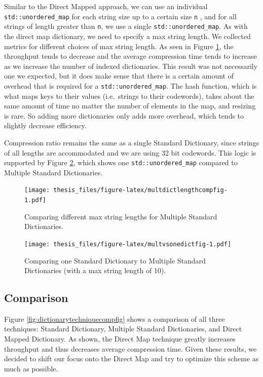 \documentclass[12pt,twoside]{reedthesis}
\begin{document}
Similar to the Direct Mapped approach, we can use an individual \texttt{std::unordered\_map} for each string size up to a certain size \texttt{n} , and for all strings of length greater than \texttt{n}, we use a single \texttt{std::unordered\_map}. As with the direct map dictionary, we need to specify a max string length. We collected metrics for different choices of max string length. As seen in Figure \ref{fig:multdictlengthcompfig}, the throughput tends to decrease and the average compression time tends to increase as we increase the number of indexed dictionaries. This result was not necessarily one we expected, but it does make sense that there is a certain amount of overhead that is required for a \texttt{std::unordered\_map}. The hash function, which is what maps keys to their values (i.e.~strings to their codewords), takes about the same amount of time no matter the number of elements in the map, and resizing is rare. So adding more dictionaries only adds more overhead, which tends to slightly decrease efficiency.

Compression ratio remains the same as a single Standard Dictionary, since strings of all lengths are accommodated and we are using 32 bit codewords.
This logic is supported by Figure \ref{fig:multvsonedictfig}, which shows one \texttt{std::unordered\_map} compared to Multiple Standard Dictionaries.
\begin{figure}
\centering
\texttt{[image: thesis\_files/figure-latex/multdictlengthcompfig-1.pdf]}
\caption{\label{fig:multdictlengthcompfig}Comparing different max string lengths for Multiple Standard Dictionaries.}
\end{figure}
\begin{figure}
\centering
\texttt{[image: thesis\_files/figure-latex/multvsonedictfig-1.pdf]}
\caption{\label{fig:multvsonedictfig}Comparing one Standard Dictionary to Multiple Standard Dictionaries (with a max string length of 10).}
\end{figure}
\hypertarget{comparison-1}{%
\subsection{Comparison}\label{comparison-1}}

Figure \ref{fig:dictionarytechniquecompfig} shows a comparison of all three techniques: Standard Dictionary, Multiple Standard Dictionaries, and Direct Mapped Dictionary. As shown, the Direct Map technique greatly increases throughput and thus decreases average compression time. Given these results, we decided to shift our focus onto the Direct Map and try to optimize this scheme as much as possible.
\end{document}
